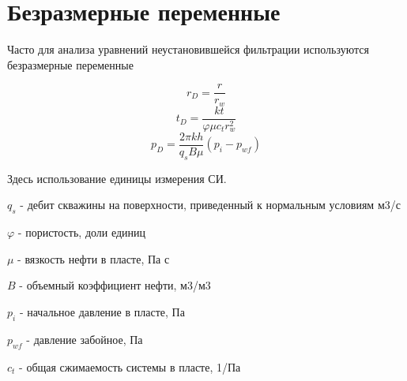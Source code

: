 \section{Безразмерные переменные}

Часто для анализа уравнений неустановившейся фильтрации используются безразмерные переменные 


$$ r_D = \frac{r}{r_w} $$
$$ t_D = \frac{kt}{\varphi \mu c_t r_w^2}$$
$$ p_D = \frac{2 \pi kh}{q_s B \mu} \left( p_i - p_{wf} \right) $$

Здесь использование единицы измерения СИ. 

$q_s$ - дебит скважины на поверхности, приведенный к нормальным условиям м3/с

$\varphi$ - пористость, доли единиц

$\mu$ - вязкость нефти в пласте, Па с

$B$ - объемный коэффициент нефти, м3/м3

$p_i$ - начальное давление в пласте, Па

$p_{wf}$ - давление забойное, Па

$c_t$ - общая сжимаемость системы в пласте, 1/Па


